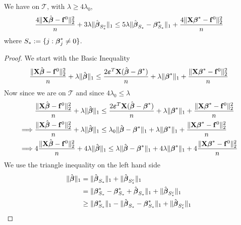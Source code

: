 \begin{lemma}
    We have on $\mathscr{T}$, with $\lambda \geq 4 \lambda_{0}$,
    \begin{equation}
        \label{eqn: new version of lemma 6.3.}
        \frac{4 \|\mathbf{X} \hat{\boldsymbol{\beta}}-\mathbf{f}^0\|_{2}^{2}}{n} + 3 \lambda \| \hat{\boldsymbol{\beta}}_{S^{c}_{*}} \|_{1} \leq 5 \lambda \| \hat{\boldsymbol{\beta}}_{S_{*}} - \boldsymbol{\beta}_{S_{*}}^{*} \|_{1} + \frac{4 \|\mathbf{X} \boldsymbol{\beta}^{*} - \mathbf{f}^{0} \|_{2}^{2}}{n}
    \end{equation}
    where $S_* := \{ j: \boldsymbol{\beta}_j^* \neq 0 \}$.
\end{lemma}
\begin{proof}
    We start with the Basic Inequality
    $$
        \frac{\|\mathbf{X} \hat {\boldsymbol{\beta}} - \mathbf{f}^0 \|_{2}^{2}}{n} + \lambda\| \hat {\boldsymbol{\beta}} \|_{1} \leq  \frac{2 \boldsymbol{\varepsilon}^T \mathbf{X} (\hat{\boldsymbol{\beta}} - \boldsymbol{\beta}^*)}{n} + \lambda \| \boldsymbol{\beta}^*\|_{1} + \frac{\|\mathbf{X} \boldsymbol{\beta}^* - \mathbf{f}^0\|_{2}^{2}}{n}
    $$
    Now since we are on $\mathscr{T}$ and since $4 \lambda_0 \leq \lambda$
    \begin{align*}
                 & \frac{\|\mathbf{X} \hat {\boldsymbol{\beta}} - \mathbf{f}^0 \|_{2}^{2}}{n} + \lambda\| \hat {\boldsymbol{\beta}} \|_{1} \leq  \frac{2 \boldsymbol{\varepsilon}^T \mathbf{X} (\hat{\boldsymbol{\beta}} - \boldsymbol{\beta}^*)}{n} + \lambda \| \boldsymbol{\beta}^*\|_{1} + \frac{\|\mathbf{X} \boldsymbol{\beta}^* - \mathbf{f}^0\|_{2}^{2}}{n} \\
        \implies &
        \frac{\|\mathbf{X} \hat {\boldsymbol{\beta}} - \mathbf{f}^0 \|_{2}^{2}}{n} + \lambda\| \hat {\boldsymbol{\beta}} \|_{1} \leq \lambda_0 \| \hat{\boldsymbol{\beta}} - \boldsymbol{\beta}^* \|_{1} + \lambda \| \boldsymbol{\beta}^*\|_{1} + \frac{\|\mathbf{X} \boldsymbol{\beta}^* - \mathbf{f}^0\|_{2}^{2}}{n}                 \\
        \implies &
        4 \frac{\| \mathbf{X} \hat {\boldsymbol{\beta}} - \mathbf{f}^0 \|_{2}^{2}}{n} + 4 \lambda\| \hat {\boldsymbol{\beta}} \|_{1} \leq \lambda \| \hat{\boldsymbol{\beta}} - \boldsymbol{\beta}^* \|_{1} + 4 \lambda \| \boldsymbol{\beta}^*\|_{1} + 4\frac{\|\mathbf{X} \boldsymbol{\beta}^* - \mathbf{f}^0\|_{2}^{2}}{n}           \\
    \end{align*}
    We use the triangle inequality on the left hand side
    \begin{align*}
        \|\hat{\boldsymbol{\beta}}\|_{1}
         & = \|\hat{\boldsymbol{\beta}}_{S_{*}} \|_{1} + \|\hat{\boldsymbol{\beta}}_{S_{*}^{c}} \|_{1}                                                \\
         & = \|\boldsymbol{\beta}_{S_{*}}^{*} - \boldsymbol{\beta}_{S_{*}}^{*} + \hat{\boldsymbol{\beta}}_{S_{*}} \|_{1} + \|\hat{\boldsymbol{\beta}}_{S_{*}^{c}} \|_{1}          \\
         & \geq \|\boldsymbol{\beta}_{S_{*}}^{*} \|_{1} - \|\hat{\boldsymbol{\beta}}_{S_{*}}-\boldsymbol{\beta}_{S_{*}}^{*} \|_{1}+ \|\hat{\boldsymbol{\beta}}_{S_{*}^{c}} \|_{1}
    \end{align*}

\end{proof}
